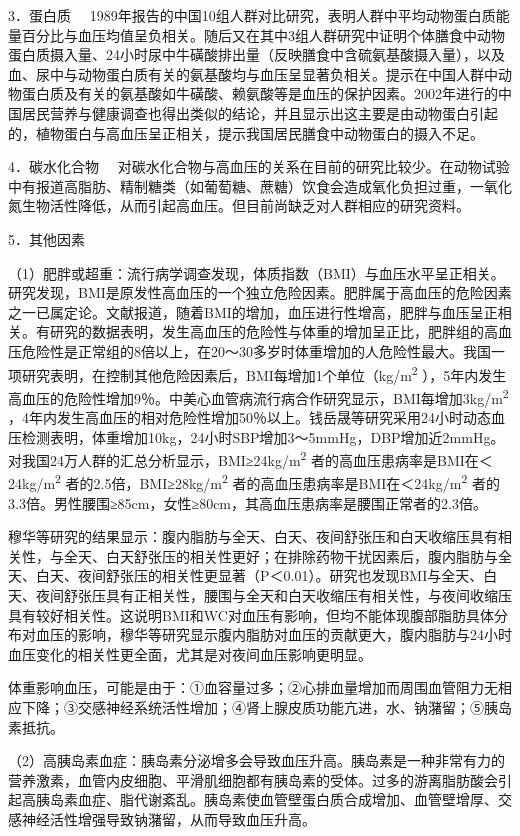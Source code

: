 {3．蛋白质}
　1989年报告的中国10组人群对比研究，表明人群中平均动物蛋白质能量百分比与血压均值呈负相关。随后又在其中3组人群研究中证明个体膳食中动物蛋白质摄入量、24小时尿中牛磺酸排出量（反映膳食中含硫氨基酸摄入量），以及血、尿中与动物蛋白质有关的氨基酸均与血压呈显著负相关。提示在中国人群中动物蛋白质及有关的氨基酸如牛磺酸、赖氨酸等是血压的保护因素。2002年进行的中国居民营养与健康调查也得出类似的结论，并且显示出这主要是由动物蛋白引起的，植物蛋白与高血压呈正相关，提示我国居民膳食中动物蛋白的摄入不足。

{4．碳水化合物}
　对碳水化合物与高血压的关系在目前的研究比较少。在动物试验中有报道高脂肪、精制糖类（如葡萄糖、蔗糖）饮食会造成氧化负担过重，一氧化氮生物活性降低，从而引起高血压。但目前尚缺乏对人群相应的研究资料。

{5．其他因素}

（1）肥胖或超重：流行病学调查发现，体质指数（BMI）与血压水平呈正相关。研究发现，BMI是原发性高血压的一个独立危险因素。肥胖属于高血压的危险因素之一已属定论。文献报道，随着BMI的增加，血压进行性增高，肥胖与血压呈正相关。有研究的数据表明，发生高血压的危险性与体重的增加呈正比，肥胖组的高血压危险性是正常组的8倍以上，在20～30多岁时体重增加的人危险性最大。我国一项研究表明，在控制其他危险因素后，BMI每增加1个单位（kg/m\textsuperscript{2}
），5年内发生高血压的危险性增加9％。中美心血管病流行病合作研究显示，BMI每增加3kg/m\textsuperscript{2}
，4年内发生高血压的相对危险性增加50％以上。钱岳晟等研究采用24小时动态血压检测表明，体重增加10kg，24小时SBP增加3～5mmHg，DBP增加近2mmHg。对我国24万人群的汇总分析显示，BMI≥24kg/m\textsuperscript{2}
者的高血压患病率是BMI在＜24kg/m\textsuperscript{2}
者的2.5倍，BMI≥28kg/m\textsuperscript{2}
者的高血压患病率是BMI在＜24kg/m\textsuperscript{2}
者的3.3倍。男性腰围≥85cm，女性≥80cm，其高血压患病率是腰围正常者的2.3倍。

穆华等研究的结果显示：腹内脂肪与全天、白天、夜间舒张压和白天收缩压具有相关性，与全天、白天舒张压的相关性更好；在排除药物干扰因素后，腹内脂肪与全天、白天、夜间舒张压的相关性更显著（P＜0.01）。研究也发现BMI与全天、白天、夜间舒张压具有正相关性，腰围与全天和白天收缩压有相关性，与夜间收缩压具有较好相关性。这说明BMI和WC对血压有影响，但均不能体现腹部脂肪具体分布对血压的影响，穆华等研究显示腹内脂肪对血压的贡献更大，腹内脂肪与24小时血压变化的相关性更全面，尤其是对夜间血压影响更明显。

体重影响血压，可能是由于：①血容量过多；②心排血量增加而周围血管阻力无相应下降；③交感神经系统活性增加；④肾上腺皮质功能亢进，水、钠潴留；⑤胰岛素抵抗。

（2）高胰岛素血症：胰岛素分泌增多会导致血压升高。胰岛素是一种非常有力的营养激素，血管内皮细胞、平滑肌细胞都有胰岛素的受体。过多的游离脂肪酸会引起高胰岛素血症、脂代谢紊乱。胰岛素使血管壁蛋白质合成增加、血管壁增厚、交感神经活性增强导致钠潴留，从而导致血压升高。

